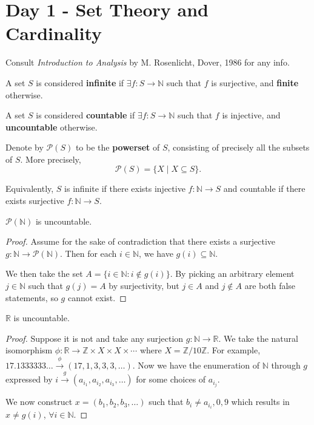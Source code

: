 \section{Day 1 - Set Theory and Cardinality}

Consult \emph{Introduction to Analysis} by M. Rosenlicht, Dover, 1986
for any info.

\begin{df}
A set $S$ is considered \textbf{infinite} if $\exists f : S \to
\mathbb{N}$ such that $f$ is surjective, and \textbf{finite} otherwise.
\end{df}

\begin{df}
A set $S$ is considered \textbf{countable} if $\exists f : S \to
\mathbb{N}$ such that $f$ is injective, and \textbf{uncountable}
otherwise.
\end{df}

\begin{df}
Denote by $\mathcal{P}(S)$ to be the \textbf{powerset} of $S$,
consisting of precisely all the subsets of $S$. More precisely,
\[ \mathcal{P}(S) = \lbrace X \mid X \subseteq S \rbrace. \]
\end{df}

\begin{rem}
Equivalently, $S$ is infinite if there exists injective $f : \mathbb{N}
\to S$ and  countable if there exists surjective $f : \mathbb{N} \to S$.
\end{rem}

\begin{ex}
$\mathcal{P}(\mathbb{N})$ is uncountable.
\end{ex}

\begin{proof}
Assume for the sake of contradiction that there exists a surjective $g :
\mathbb{N} \rightarrow \mathcal{P}(\mathbb{N})$.  Then for each $i \in
\mathbb{N}$, we have $g(i) \subseteq \mathbb{N}$.

We then take the set $A = \lbrace i \in \mathbb{N} : i \not \in g(i)
\rbrace$. By picking an arbitrary element $j \in \mathbb{N}$ such that
$g(j) = A$ by surjectivity, but $j \in A$ and $j \not \in A$ are both
false statements, so $g$ cannot exist.
\end{proof}

\begin{ex}
$\mathbb{R}$ is uncountable.
\end{ex}

\begin{proof}
Suppose it is not and take any surjection $g : \mathbb{N} \to
\mathbb{R}$. We take the natural isomorphism $\phi : \mathbb{R}
\rightarrow \mathbb{Z} \times X \times X \times \cdots$ where $X =
\mathbb{Z}/10\mathbb{Z}$. For example, $17.1333333\dots
\xrightarrow{\phi} (17, 1, 3, 3, 3, \dots)$. Now we have the enumeration
of $\mathbb{N}$ through $g$ expressed by $i \xrightarrow{g} (a_{i_1},
a_{i_2}, a_{i_3}, \dots)$ for some choices of $a_{i_j}$.

We now construct $x = (b_1, b_2, b_3, \dots)$ such that $b_i \neq
a_{i_i}, 0, 9$ which results in $x \neq g(i)$, $\forall i \in
\mathbb{N}$.
\end{proof}
